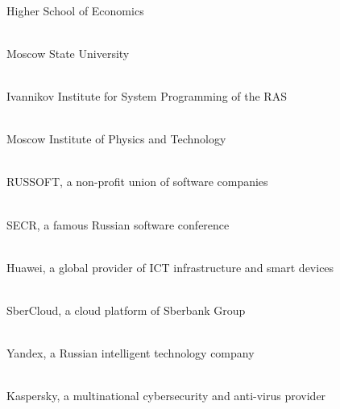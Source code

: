 
\clearpage
{}

\newcommand\partner[3]{ \\ #3}

\partner{height=0.8in}{partners/hse}{Higher School of Economics}

\partner{height=0.7in}{partners/msu}{Moscow State University}

\partner{height=0.4in}{partners/isp}{Ivannikov Institute for System Programming of the RAS}

\partner{height=0.5in}{partners/mipt}{Moscow Institute of Physics and Technology}

\partner{height=0.5in}{partners/russoft}{RUSSOFT, a non-profit union of software companies}

\partner{height=0.3in}{partners/secr}{SECR, a famous Russian software conference}

\partner{height=0.5in}{partners/huawei}{Huawei, a global provider of ICT infrastructure and smart devices}

\partner{width=2in}{partners/sbercloud}{SberCloud, a cloud platform of Sberbank Group}

\partner{width=1.2in}{partners/yandex}{Yandex, a Russian intelligent technology company}

\partner{width=2in}{partners/kaspersky}{Kaspersky, a multinational cybersecurity and anti-virus provider}

